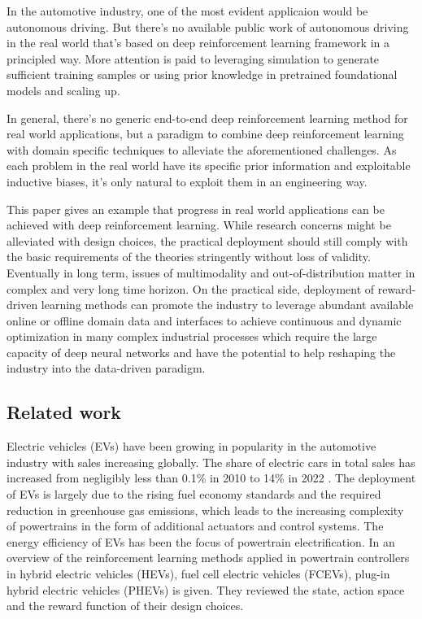 \documentclass{article}
\begin{document}
In the automotive industry, one of the most evident applicaion would be autonomous driving. But there's no available public work of autonomous driving in the real world that's based on deep reinforcement learning framework in a principled way. More attention is paid to leveraging simulation to generate sufficient training samples or using prior knowledge in pretrained foundational models and scaling up.

In general, there's no generic end-to-end deep reinforcement learning method for real world applications, but a paradigm to combine deep reinforcement learning with domain specific techniques to alleviate the aforementioned challenges. As each problem in the real world have its specific prior information and exploitable inductive biases, it's only natural to exploit them in an engineering way.

This paper gives an example that progress in real world applications can be achieved with deep reinforcement learning. While research concerns might be alleviated with design choices, the practical deployment should still comply with the basic requirements of the theories stringently without loss of validity. Eventually in long term, issues of multimodality and out-of-distribution matter in complex and very long time horizon. On the practical side, deployment of reward-driven learning methods can promote the industry to leverage abundant available online or offline domain data and interfaces to achieve continuous and dynamic optimization in many complex industrial processes which require the large capacity of deep neural networks and have the potential to help reshaping the industry into the data-driven paradigm.

\subsection{Related work}\label{sec:related}

Electric vehicles (EVs) have been growing in popularity in the automotive industry with sales increasing globally. The share of electric cars in total sales has increased from negligibly less than 0.1\% in 2010 to 14\% in 2022 \parencite{statista_2023}. The deployment of EVs is largely due to the rising fuel economy standards and the required reduction in greenhouse gas emissions, which leads to the increasing complexity of powertrains in the form of additional actuators and control systems. The energy efficiency of EVs has been the focus of powertrain electrification. In \parencite{Egan_2023} an overview of the reinforcement learning methods applied in powertrain controllers in hybrid electric vehicles (HEVs), fuel cell electric vehicles (FCEVs), plug-in hybrid electric vehicles (PHEVs) is given. They reviewed the state, action space and the reward function of their design choices.
\end{document}
